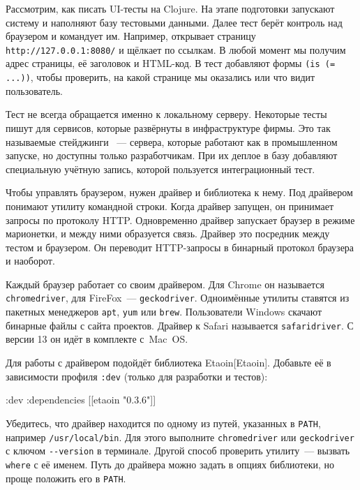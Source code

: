 Рассмотрим, как писать UI-тесты на Clojure. На этапе подготовки запускают
систему и наполняют базу тестовыми данными. Далее тест берёт контроль над
браузером и командует им. Например, открывает страницу \verb|http://127.0.0.1:8080/|
и щёлкает по ссылкам. В любой момент мы получим адрес страницы, её заголовок
и HTML-код. В тест добавляют формы \verb|(is (= ...))|, чтобы проверить,
на какой странице мы оказались или что видит пользователь.

Тест не всегда обращается именно к локальному серверу. Некоторые тесты пишут для
сервисов, которые развёрнуты в инфраструктуре фирмы. Это так называемые
стейджинги ~--- сервера, которые работают как в промышленном
запуске, но доступны только разработчикам. При их деплое в базу добавляют
специальную учётную запись, которой пользуется интеграционный тест.


Чтобы управлять браузером, нужен драйвер и библиотека к нему. Под драйвером
понимают утилиту командной строки. Когда драйвер запущен, он принимает запросы
по протоколу HTTP. Одновременно драйвер запускает браузер в режиме марионетки, и
между ними образуется связь. Драйвер это посредник между тестом и браузером. Он
переводит HTTP-запросы в бинарный протокол браузера и наоборот.


Каждый браузер работает со своим драйвером. Для Chrome он называется
\verb|chromedriver|, для FireFox~--- \verb|geckodriver|. Одноимённые утилиты
ставятся из пакетных менеджеров \verb|apt|, \verb|yum| или
\verb|brew|. Пользователи Windows скачают бинарные файлы с сайта
проектов. Драйвер к Safari называется \verb|safaridriver|. С версии 13 он
идёт в комплекте с~Mac~OS.


Для работы с драйвером подойдёт библиотека Etaoin[Etaoin].
Добавьте её в зависимости профиля \verb|:dev| (только для разработки и тестов):

\begin{english}
  \begin{clojure}
:dev {:dependencies [[etaoin "0.3.6"]]}
  \end{clojure}
\end{english}

Убедитесь, что драйвер находится по одному из путей, указанных в \verb|PATH|,
например \verb|/usr/local/bin|. Для этого выполните \verb|chromedriver| или
\verb|geckodriver| с ключом \verb|--version| в терминале. Другой способ
проверить утилиту~--- вызвать \verb|where| с её именем. Путь до драйвера можно
задать в опциях библиотеки, но проще положить его в \verb|PATH|.

